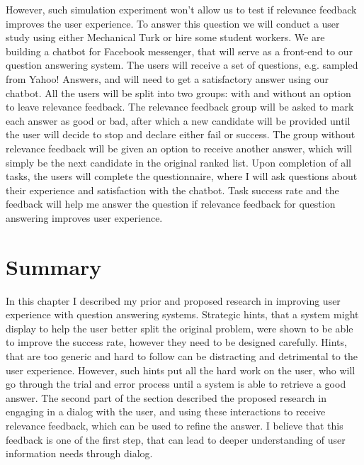 However, such simulation experiment won't allow us to test if relevance feedback improves the user experience.
To answer this question we will conduct a user study using either Mechanical Turk or hire some student workers.
We are building a chatbot for Facebook messenger, that will serve as a front-end to our question answering system.
The users will receive a set of questions, e.g. sampled from Yahoo! Answers, and will need to get a satisfactory answer using our chatbot.
All the users will be split into two groups: with and without an option to leave relevance feedback.
The relevance feedback group will be asked to mark each answer as good or bad, after which a new candidate will be provided until the user will decide to stop and declare either fail or success.
The group without relevance feedback will be given an option to receive another answer, which will simply be the next candidate in the original ranked list.
Upon completion of all tasks, the users will complete the questionnaire, where I will ask questions about their experience and satisfaction with the chatbot.
Task success rate and the feedback will help me answer the question if relevance feedback for question answering improves user experience.

\section{Summary}
\label{section:users:summary}

In this chapter I described my prior and proposed research in improving user experience with question answering systems.
Strategic hints, that a system might display to help the user better split the original problem, were shown to be able to improve the success rate, however they need to be designed carefully.
Hints, that are too generic and hard to follow can be distracting and detrimental to the user experience.
However, such hints put all the hard work on the user, who will go through the trial and error process until a system is able to retrieve a good answer.
The second part of the section described the proposed research in engaging in a dialog with the user, and using these interactions to receive relevance feedback, which can be used to refine the answer.
I believe that this feedback is one of the first step, that can lead to deeper understanding of user information needs through dialog.
